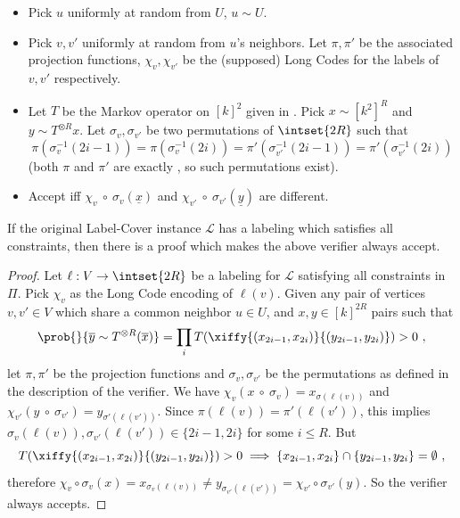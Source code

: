 \begin{itemize}
\vspace{-1ex}
\itemsep=0ex
\item Pick $u$ uniformly at random from $U$, $u\sim U$.
\item Pick $v,v'$ uniformly at random from $u$'s neighbors. Let $\pi,
  \pi'$ be the associated projection functions, $\chi_v, \chi_{v'}$ be
  the (supposed) Long Codes for the labels of $v, v'$ respectively.
\item Let $T$ be the Markov operator on $[k]^2$ given in . Pick $x \sim [k^2]^R$ and $y \sim T^{\otimes R}
  x$. Let $\sigma_v,\sigma_{v'}$ be two permutations of $\intset{2 R}$ such
  that \[\pi(\sigma^{-1}_v(2i-1)) = \pi(\sigma^{-1}_v(2i)) =
  \pi'(\sigma_{v'}^{-1}(2i-1)) = \pi'(\sigma_{v'}^{-1}(2i))\] (both $\pi$ and
  $\pi'$ are exactly , so such permutations exist).
\item Accept iff $\chi_v\ \circ\ \sigma_v (\underline{x}) $ and
  $\chi_{v'} \ \circ\ \sigma_{v'}(\underline{y})$ are different.
\end{itemize}
%
%
%
\begin{lemma}[Completeness]
\label{lem:kcol-compl}
  If the original  Label-Cover instance $\mathcal{L}$ has a
  labeling which satisfies all constraints, then there is a proof
  which makes the above verifier always accept.
\end{lemma}
%
\begin{proof}
  Let $\ell:V\to \intset{2 R}$ be a labeling for $\mathcal{L}$
  satisfying all constraints in $\Pi$. Pick $\chi_v$ as the Long Code
  encoding of $\ell(v)$. Given any pair of vertices $v,v' \in V$ which
  share a common neighbor $u \in U$, and $x,y\in [k]^{2 R}$ pairs such
  that 
\[ \prob{}{\overline{y} \sim T^{\otimes R}(\overline{x})} = \prod_i
  T(\xiffy{(x_{2i-1},x_{2i})}{(y_{2i-1},y_{2i})})>0 \ , \]
%
 let $\pi,\pi'$
  be the projection functions and $\sigma_v,\sigma_{v'}$ be the permutations
  as defined in the description of the verifier. We have $\chi_v(x \ \circ\ \sigma_v) =
  x_{\sigma(\ell(v))}$ and $\chi_{v'}(y \ \circ\ \sigma_{v'}) =
  y_{\sigma'(\ell(v'))}$. Since $\pi(\ell(v)) = \pi'(\ell(v'))$, this
  implies $\sigma_v(\ell(v)),\sigma_{v'}(\ell(v')) \in \{2i-1,2i\}$ for some
  $i\le R$. But 
\[ T(\xiffy{(x_{2i-1},x_{2i})}{(y_{2i-1},y_{2i})})>0
  \implies \{x_{2i-1},x_{2i}\}\cap \{y_{2i-1},y_{2i}\}=\emptyset \ , \]
%
  therefore $\chi_{v}\circ \sigma_v(x) = x_{\sigma_v(\ell(v))} \neq
  y_{\sigma_{v'}(\ell(v'))}=\chi_{v'}\circ \sigma_{v'}(y)$. So the verifier always accepts.
\end{proof}
